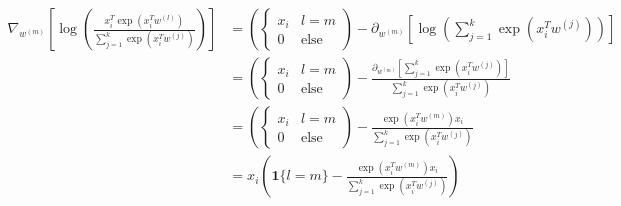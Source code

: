 \documentclass[]{article}
\begin{document}
        \begin{align*}\tag{B.4.3}\label{eqn:B.4.3}
            \nabla_{w^{(m)}} \left[
                \log \left(
                \frac{x_i^T\exp(x_i^T w^{(l)})}{
                    \sum_{j = 1}^{k}
                        \exp(x_i^T w^{(j)})
                }
                \right)
            \right] &= 
            \left(
                \begin{cases}
                    x_i  & l = m 
                    \\
                    0 & \text{else}      
                \end{cases}
            \right)
            -
            \partial_{w^{(m)}}\left[
                \log
                \left(
                    \sum_{j = 1}^{k}
                        \exp\left(
                            x_i^T w^{(j)}
                        \right)
                \right)
            \right]
            \\
            &=
            \left(
                \begin{cases}
                    x_i  & l = m 
                    \\
                    0 & \text{else}      
                \end{cases}
            \right)
            -
            \frac{
                \partial_{w^{(m)}} \left[
                    \sum_{j = 1}^{k}
                        \exp\left(
                            x_i^T w^{(j)}
                        \right)
                \right]
            }{
                    \sum_{j = 1}^{k}
                        \exp\left(
                            x_i^T w^{(j)}
                        \right)
            }
            \\
            &=
            \left(
                \begin{cases}
                    x_i  & l = m 
                    \\
                    0 & \text{else}      
                \end{cases}
            \right)
            -
            \frac{
                \exp(x_i^T w^{(m)})x_i
            }{
            \sum_{j = 1}^{k}
                \exp\left(
                    x_i^T w^{(j)}
                \right)
            }
            \\
            &= 
            x_i\left(
                \mathbf{1}\{l = m\} - 
                \frac{
                    \exp(x_i^T w^{(m)})x_i
                }{
                \sum_{j = 1}^{k}
                    \exp\left(
                        x_i^T w^{(j)}
                    \right)
                }
            \right)
        \end{align*}
\end{document}
